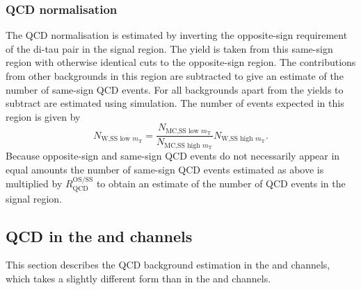 \subsubsection{QCD normalisation}
\label{sec:mssm_bkgs_etmt_qcdnorm}
The QCD normalisation is estimated by inverting the opposite-sign requirement
of the di-tau pair in the signal region. The yield is taken from this same-sign
region with otherwise identical cuts to the opposite-sign region. The contributions
from other backgrounds in this region are subtracted to give an estimate of the number
of same-sign QCD events. For all backgrounds apart from \Wjets the
yields to subtract are estimated using simulation. The number of \Wjets events
expected in this region is given by
\begin{equation}\label{eqn:wjets_qcdsub}
N_{\text{W,SS low }m_{\text{T}}} = \frac{N_{\text{MC,SS low }m_{\text{T}}}}{N_{\text{MC,SS high }m_{\text{T}}}}N_{\text{W,SS high }m_{\text{T}}}.
\end{equation}
Because opposite-sign and same-sign QCD events do not
necessarily appear in equal amounts the number of same-sign QCD
events estimated as above is multiplied
by $R_{\text{QCD}}^{\text{OS/SS}}$ 
to obtain an estimate of the number of QCD events in the signal region.

\subsection{\texorpdfstring{QCD in the \tautau and \emu channels}{QCD in the tautau and emu channels}}
\label{sec:mssm_bkgs_qcd}
This section describes the QCD background
estimation in the \tautau and \emu channels, which takes a slightly
different form than in the \mutau and \etau channels.

